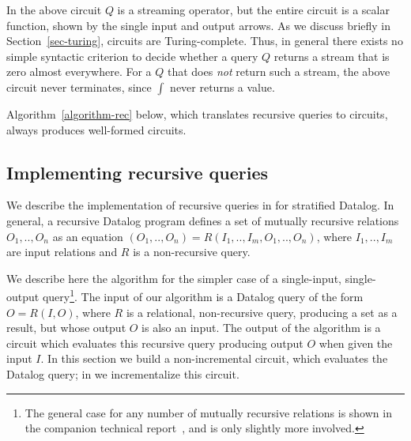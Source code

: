 In the above circuit $Q$ is a streaming operator, but the entire
circuit is a scalar function, shown by the single input and output
arrows.  As we discuss briefly in Section~\ref{sec-turing}, \dbsp
circuits are Turing-complete.  Thus, in general there exists no simple
syntactic criterion to decide whether a query $Q$ returns a stream
that is zero almost everywhere.  For a $Q$ that does \emph{not} return
such a stream, the above circuit never terminates, since $\int$ never
returns a value.

Algorithm~\ref{algorithm-rec} below, which translates recursive queries to
\dbsp circuits, always produces well-formed circuits.

\vspace{-3ex}
\subsection{Implementing recursive queries}\label{sec:datalog}

We describe the implementation of recursive queries in \dbsp for
stratified Datalog.
In general, a recursive Datalog program defines a set of
mutually recursive relations $O_1,..,O_n$ as an equation
$(O_1,..,O_n)=R(I_1,..,I_m, O_1,..,O_n)$, where $I_1,..,I_m$ are
input relations and $R$ is a non-recursive query.

We describe here the algorithm for the simpler case of a single-input,
single-output query\footnote{The general case for any number of
mutually recursive relations is shown in the companion technical
report~\cite{tr}, and is only slightly more involved.}.  The input of
our algorithm is a Datalog query of the form $O = R(I, O)$, where $R$
is a relational, non-recursive query, producing a set as a result, but
whose output $O$ is also an input.  The output of the algorithm is a
\dbsp circuit which evaluates this recursive query producing output
$O$ when given the input $I$.  In this section we build a
non-incremental circuit, which evaluates the Datalog query; in
 we incrementalize this circuit.

